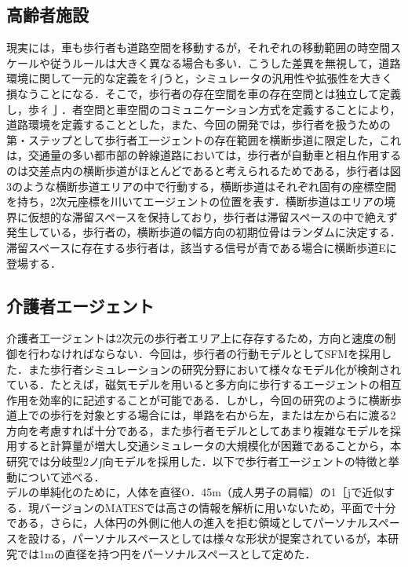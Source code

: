 \subsection{高齢者施設}

現実には，車も歩行者も道路空間を移動するが，それぞれの移動範囲の時空間スケールや従うルールは大きく異なる場合も多い．こうした差異を無視して，道路環境に関して一元的な定義を彳∫うと，シミュレータの汎用性や拡張性を大きく損なうことになる．そこで，歩行者の存在空間を車の存在空問とは独立して定義し，歩彳亅．者空問と車空間のコミュニケーション方式を定義することにより，道路環境を定義することとした，また、今回の開発では，歩行者を扱うための第・ステップとして歩行者工一ジェントの存在範囲を横断歩道に限定した，これは，交通量の多い都市部の幹線道路においては，歩行者が自動車と相彑作用するのは交差点内の横断歩道がほとんどであると考えられるためである，歩行者は図3のような横断歩道エリアの中で行動する，横断歩道はそれぞれ固有の座標空間を持ち，2次元座標を川いてエージェントの位置を表す．横断歩道はエリアの境界に仮想的な滞留スペースを保持しており，歩行者は滞留スペースの中で絶えず発生している，歩行者の，横断歩道の幅方向の初期位骨はランダムに決定する．滞留スベースに存在する歩行者は，該当する信号が青である場合に横断歩道Eに登場する．

\subsection{介護者エージェント}

介護者工一ジェントは2次元の歩行者エリア上に存存するため，方向と速度の制御を行わなければならない．今回は，歩行者の行動モデルとしてSFMを採用した．また歩行者シミュレーションの研究分野において様々なモデル化が検剤されている\cite{ex_pedestrian_simulation_1,ex_pedestrian_simulation_2}．たとえば，磁気モデルを用いると多方向に歩行するエージェントの相互作用を効率的に記述することが可能である．しかし，今回の研究のように横断歩道上での歩行を対象とする場合には，単路を右から左，または左から右に渡る2方向を考慮すれば十分である，また歩行者モデルとしてあまり複雑なモデルを採用すると計算量が増大し交通シミュレータの大規模化が困難であることから，本研究では分岐型2ノ∫向モデルを採用した．以下で歩行者工一ジェントの特徴と挙動について述べる．\\
デルの単純化のために，人体を直径O．45m（成人男子の肩幅）の1［jで近似する．現バージョンのMATESでは高さの情報を解析に用いないため，平面で十分である，さらに，人体円の外側に他人の進入を拒む領域としてパーソナルスペースを設ける，パーソナルスペースとしては様々な形状が提案されているが\cite{ex_personal_space}，本研究では1mの直径を持つ円をパーソナルスペースとして定めた．

